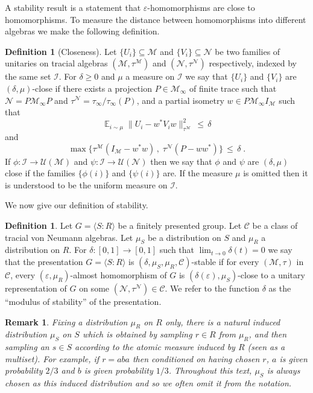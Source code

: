 \documentclass[11pt]{article}
\newtheorem{remark}[theorem]{Remark}
\theoremstyle{definition}
\newtheorem{definition}[theorem]{Definition}
\newcommand{\Id}{\ensuremath{I}}
\DeclareMathOperator*{\Expectation}{\mathbb{E}}
\newcommand{\Es}[1]{\Expectation_{#1}}
\newcommand{\mC}{\ensuremath{\mathcal{C}}}
\newcommand{\mM}{\ensuremath{\mathcal{M}}}
\newcommand{\mI}{\ensuremath{\mathcal{I}}}
\newcommand{\cM}{\ensuremath{\mathcal{M}}}
\newcommand{\mU}{\ensuremath{\mathcal{U}}}
\newcommand{\eps}{\varepsilon}
\newcommand{\mN}{\mathcal{N}}
\begin{document}
A stability result is a statement that $\eps$-homomorphisms are close to homomorphisms. To measure the distance between homomorphisms into different algebras we make the following definition. 


\begin{definition}[Closeness]\label{def:close}
Let $\{U_i\}\subseteq \mM$ and $\{V_i\}\subseteq \mN$ be two families of unitaries on  tracial algebras $(\mM,\tau^\mM)$ and $(\mN,\tau^\mN)$ respectively, indexed by the same set $\mI$. For $\delta\geq0$ and $\mu$ a measure on $\mI$ we say that $\{U_i\}$ and $\{V_i\}$ are $(\delta,\mu)$-close if there exists a projection $P\in\mM_\infty$ of finite trace such that $\mN=P\mM_\infty P$ and $\tau^\mN=\tau_\infty/\tau_\infty(P)$, and a partial isometry $w\in P \mM_\infty \Id_\mM$ such that 
\[ \Es{i\sim\mu} \big\| U_i - w^* V_i w \big\|_{\tau^\mM}^2 \,\leq\,\delta\]
and 
\[\max\big\{ \tau^\mM(\Id_\mM-w^*w)\,,\; \tau^\mN(P-ww^*)\big\} \,\leq\, \delta\;.\]
If $\phi:\mI\to \mU(\mM)$ and $\psi:\mI\to \mU(\mN)$ then we say that $\phi$ and $\psi$ are $(\delta,\mu)$ close if the families $\{\phi(i)\}$ and $\{\psi(i)\}$ are. 
If the measure $\mu$ is omitted then it is understood to be the uniform measure on $\mI$.
\end{definition}

We now give our definition of stability.

\begin{definition}\label{def:eff-stab}
Let $G = \langle S:R\rangle $ be a finitely presented group. Let $\mC$ be a class of tracial von Neumann algebras. Let $\mu_S$ be a distribution on $S$ and $\mu_R$ a distribution on $R$. For $\delta:[0,1]\to[0,1]$ such that $\lim_{t\to 0}\delta(t)=0$ we say that the presentation $G=\langle S:R\rangle$ is $(\delta,\mu_S,\mu_R,\mC)$-stable if for every $(\cM,\tau)$ in $\mC$, every $(\eps,\mu_R)$-almost homomorphism of $G$ is $(\delta(\eps),\mu_S)$-close to a unitary representation of $G$ on some $(\mN,\tau^\mN)\in \mC$. We refer to the function $\delta$ as the ``modulus of stability'' of the presentation.
\end{definition}

\begin{remark}
Fixing a distribution $\mu_R$ on $R$ only, there is a natural induced distribution $\mu_S$ on $S$ which is obtained by sampling $r\in R$ from $\mu_R$, and then sampling an $s\in S$ according to the atomic measure induced by $R$ (seen as a multiset). For example, if $r=aba$ then conditioned on having chosen $r$, $a$ is given probability $2/3$ and $b$ is given probability $1/3$. Throughout this text, $\mu_S$ is always chosen as this induced distribution and so we often omit it from the notation. 
\end{remark}
\end{document}
